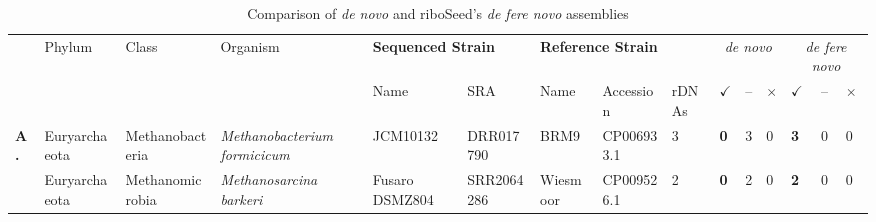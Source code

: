 \begin{sidewaystable}[!hb]
  \centering
  \caption{Comparison of \textit{de novo} and riboSeed's \textit{de fere novo} assemblies}
  \label{table:phyla}
  \begin{tabular}{p{.25cm}p{2.05cm}p{2.65cm}p{4.05cm}p{2.55cm}p{1.75cm}p{2.25cm}p{1.95cm}p{.6cm}>{\hfill}p{.4cm}p{.2cm}p{.1cm}>{\hfill}p{.4cm}p{.2cm}p{.1cm}}
    \toprule
    & \multirow{2}{*}{Phylum} & \multirow{2}{*}{Class}  & \multirow{2}{*}{Organism} & \multicolumn{2}{l}{\textbf{Sequenced Strain}}  &  \multicolumn{3}{l}{\textbf{Reference Strain}} &  \multicolumn{3}{c}{\textit{de novo}} & \multicolumn{3}{c}{\textit{de fere novo}} \\
    & & & & Name & SRA & Name & Accession & rDNAs & \textbf{$\checkmark$} & -- & $\times$ & \textbf{$\checkmark$} & -- & $\times$  \\
    \toprule
   \multirow{2}{*}{\textbf{A.}} &Euryarchaeota  & Methanobacteria       & \textit{Methanobacterium formicicum} &   JCM10132                                              & DRR017790  & BRM9        &CP006933.1        & 3  & \textbf{0} & 3  & 0 & \textbf{3} & 0 & 0 \\
    &Euryarchaeota  & Methanomicrobia       & \textit{Methanosarcina    barkeri} &     Fusaro DSMZ804                                        & SRR2064286 & Wiesmoor    &CP009526.1        & 2  & \textbf{0} & 2  & 0 & \textbf{2} & 0 & 0 \\

    \midrule


\end{tabular}
\end{sidewaystable}
